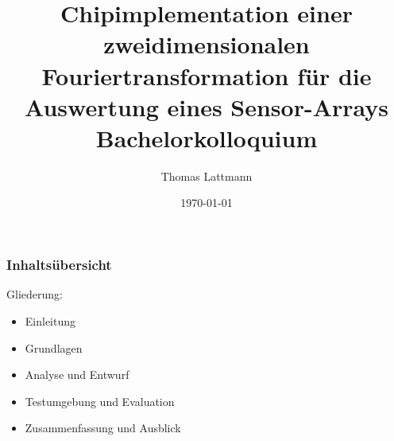 

\title[Chipimplementation einer 2D-DFT für die Auswertung eines Sensor-Arrays]{\LARGE{Chipimplementation einer zweidimensionalen Fouriertransformation für die Auswertung eines Sensor-Arrays}\\ 
\medskip \medskip \medskip \medskip \medskip  \large{Bachelorkolloquium}\\
\medskip }  

\author[TL]{Thomas Lattmann}
\date[\today]{\today} 



\begin{frame}[plain]
 	\titlepage
\end{frame}



\begin{frame}\frametitle{Inhaltsübersicht}

Gliederung:
\begin{itemize}
 \item Einleitung
 \item Grundlagen
 \item Analyse und Entwurf
 \item Testumgebung und Evaluation
 \item Zusammenfassung und Ausblick
\end{itemize}
\end{frame}


